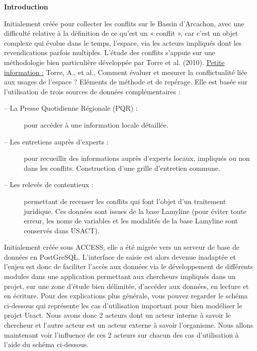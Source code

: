 \documentclass[12pt,a4paper]{article}
\begin{document}
\vspace{1cm}
\begin{center}
\bf 
\color{titreColor}
\LARGE{Introduction}
\end{center}
Initialement créée pour collecter les conflits sur le Bassin d’Arcachon, avec une difficulté relative à la définition de ce qu’est un « conflit »,  car c’est un  objet complexe qui évolue dans le temps, l’espace, via les acteurs impliqués dont les revendications parfois multiples. L’étude des conflits s’appuie sur une méthodologie bien particulière développée par Torre et al. (2010). \newline
\underline {Petite information :} Torre, A., et al., Comment évaluer et mesurer la conflictualité liée aux usages de l'espace ? Eléments de méthode et de repérage. \newline \newline
Elle est basée sur l’utilisation de trois sources de données complémentaires :
\begin{description}
\item[–	La Presse Quotidienne Régionale  (PQR) :] pour accéder à une information locale détaillée. 
\item[–	Les entretiens auprès d’experts :] pour recueillir des informations auprès d’experts locaux, impliqués ou non dans les conflits. Construction d’une grille d’entretien commune. 
\item[–	Les relevés de contentieux :] permettant de recenser les conflits qui font l’objet d’un  traitement juridique. Ces données sont issues de la base Lamyline (pour éviter toute erreur, les noms de variables et les modalités de la base Lamyline sont conservés dans USACT). \newline
\end{description}


Initialement créée sous ACCESS, elle a été migrée vers un serveur de base de données en PostGreSQL. L’interface de saisie est alors devenue inadaptée et l’enjeu est donc de faciliter l’accès aux données via le développement de différents modules dans une application permettant aux chercheurs impliqués dans un projet, sur une zone d’étude bien délimitée, d’accéder aux données, en lecture et en écriture. \newline \newline
Pour des explications plus générale, vous pouvez regarder le schéma ci-dessous qui représente les cas d'utilisation important pour bien modéliser le projet Usact. \newline
Nous avons donc 2 acteurs dont un acteur interne à savoir le chercheur et l'autre acteur est un acteur externe à savoir l'organisme. \newline
Nous allons maintenant voir l'influence de ces 2 acteurs sur chacun des cas d'utilisation à l'aide du schéma ci-dessous.
\end{document}
